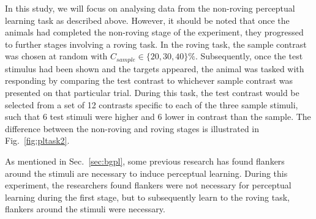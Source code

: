 In this study, we will focus on analysing data from the non-roving perceptual learning task as described above. However, it should be noted that once the animals had completed the non-roving stage of the experiment, they progressed to further stages involving a roving task. In the roving task, the sample contrast was chosen at random with $C_{sample} \in \{20, 30, 40\}\%$. Subsequently, once the test stimulus had been shown and the targets appeared, the animal was tasked with responding by comparing the test contrast to whichever sample contrast was presented on that particular trial. During this task, the test contrast would be selected from a set of 12 contrasts specific to each of the three sample stimuli, such that 6 test stimuli were higher and 6 lower in contrast than the sample. The difference between the non-roving and roving stages is illustrated in Fig.~\ref{fig:pltask2}.
%

As mentioned in Sec.~\ref{sec:bgpl}, some previous research has found flankers around the stimuli are necessary to induce perceptual learning.
During this experiment, the researchers found flankers were not necessary for perceptual learning during the first stage, but to subsequently learn to the roving task, flankers around the stimuli were necessary.

